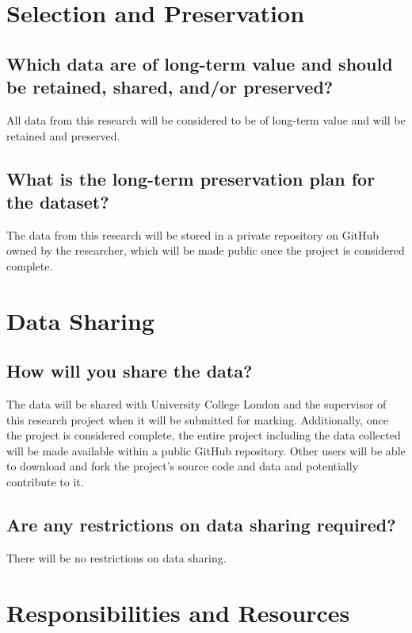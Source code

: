 \documentclass{article} %
\begin{document}
\section{Selection and Preservation}

\subsection{Which data are of long-term value and should be retained, shared, and/or preserved?}

All data from this research will be considered to be of long-term value and will be retained and preserved.

\subsection{What is the long-term preservation plan for the dataset?}

The data from this research will be stored in a private repository on GitHub owned by the researcher, which will be made public once the project is considered complete.

\section{Data Sharing}

\subsection{How will you share the data?}

The data will be shared with University College London and the supervisor of this research project when it will be submitted for marking. Additionally, once the project is considered complete, the entire project including the data collected will be made available within a public GitHub repository. Other users will be able to download and fork the project’s source code and data and potentially contribute to it.

\subsection{Are any restrictions on data sharing required?}

There will be no restrictions on data sharing.

\section{Responsibilities and Resources}
\end{document}
